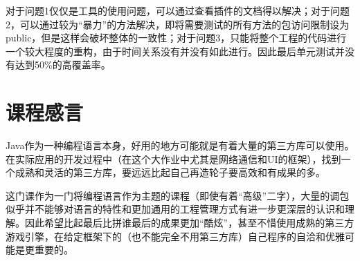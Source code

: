 \documentclass{SCIS2022cn}
\begin{document}
对于问题1仅仅是工具的使用问题，可以通过查看插件的文档得以解决；对于问题2，可以通过较为“暴力”的方法解决，即将需要测试的所有方法的包访问限制设为public，但是这样会破坏整体的一致性；对于问题3，只能将整个工程的代码进行一个较大程度的重构，由于时间关系没有并没有如此进行。因此最后单元测试并没有达到50\%的高覆盖率。



\section{课程感言}
Java作为一种编程语言本身，好用的地方可能就是有着大量的第三方库可以使用。在实际应用的开发过程中（在这个大作业中尤其是网络通信和UI的框架），找到一个成熟和灵活的第三方库，要远远比起自己再造轮子要高效和有成果的多。

这门课作为一门将编程语言作为主题的课程（即使有着“高级”二字），大量的调包似乎并不能够对语言的特性和更加通用的工程管理方式有进一步更深层的认识和理解。因此希望比起最后比拼谁最后的成果更加“酷炫”，甚至不惜使用成熟的第三方游戏引擎，在给定框架下的（也不能完全不用第三方库）自己程序的自洽和优雅可能是更重要的。
\end{document}
